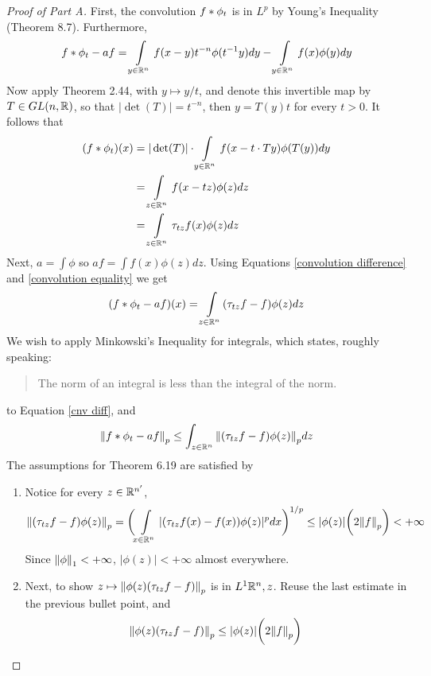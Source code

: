 \documentclass[../../main.tex]{subfiles}
\begin{document}
\begin{proof}[Proof of Part A]
    First, the convolution $f\ast \phi_t$ is in $L^p$ by Young's Inequality (Theorem 8.7). Furthermore, 
    \begin{equation}\label{convolution difference}
        f\ast \phi_t - af = \int\limits_{y\in\mathbb{R}^n} f(x-y)t^{-n}\phi(t^{-1}y)dy - \int\limits_{y\in\mathbb{R}^n} f(x)\phi(y)dy
    \end{equation}
    Now apply Theorem 2.44, with $y\mapsto y/t$, and denote this invertible map by $T\in GL(n,\mathbb{R})$, so that $|\det(T)|=t^{-n}$, then $y = T(y)t$ for every $t>0$. It follows that
    \begin{align}
    (f\ast \phi_t)(x)&=|\det(T)|\cdot\int\limits_{y\in\mathbb{R}^n}f(x-t\cdot Ty)\phi(T(y))dy\nonumber\\
    &=\int\limits_{z\in\mathbb{R}^n}f(x-tz)\phi(z)dz\nonumber\\
    &=\int\limits_{z\in\mathbb{R}^n}\tau_{tz} f(x)\phi(z)dz\label{convolution equality}
    \end{align}
    Next,  $a=\int\phi$ so $af = \int f(x)\phi(z)dz$. Using Equations \eqref{convolution difference} and \eqref{convolution equality} we get
    \begin{equation}\label{cnv diff}
        (f\ast \phi_t - af)(x) = \int\limits_{z\in\mathbb{R}^n}(\tau_{tz}f-f)\phi(z)dz
    \end{equation}
    We wish to apply Minkowski's Inequality for integrals, which states, roughly speaking:
    \begin{quote}
        The norm of an integral is less than the integral of the norm.
    \end{quote}
    to Equation \eqref{cnv diff}, and 
    \begin{equation}\label{minkowski inequality cnv}
        \norm{f\ast\phi_t -af}_p\leq \int_{z\in\mathbb{R} ^n}\norm{(\tau_{tz}f-f)\phi(z)}_pdz
    \end{equation}
    The assumptions for Theorem 6.19 are satisfied by
    \begin{enumerate}
        \item  Notice for every $z\in\mathbb{R}^{n'}$, \[\norm{(\tau_{tz}f-f)\phi(z)}_p = \biggl(\int\limits_{x\in\mathbb{R}^n}|(\tau_{tz}f(x)-f(x))\phi(z)|^pdx\biggr)^{1/p}\leq |\phi(z)|\biggl(2\norm{f}_p\biggr)<+\infty\]
        Since $\norm{\phi}_1<+\infty$, $|\phi(z)|<+\infty$ almost everywhere. 
        \item Next, to show $z\mapsto \norm{\phi(z)(\tau_{tz}f-f)}_p$ is in $L^1{\mathbb{R}^n,z}$. Reuse the last estimate in the previous bullet point, and \[\norm{\phi(z)(\tau_{tz}f-f)}_p\leq |\phi(z)|\biggl(2\norm{f}_p\biggr)\]

\end{enumerate}
\end{proof}
\end{document}
